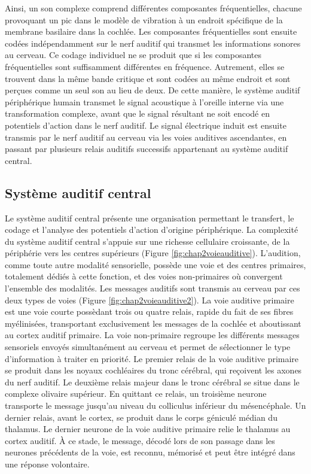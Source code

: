 Ainsi, un son complexe comprend différentes composantes fréquentielles, chacune provoquant un pic dans le modèle de vibration à un endroit spécifique de la membrane basilaire dans la cochlée. 
Les composantes fréquentielles sont ensuite codées indépendamment sur le nerf auditif qui transmet les informations sonores au cerveau. 
Ce codage individuel ne se produit que si les composantes fréquentielles sont suffisamment différentes en fréquence. 
Autrement, elles se trouvent dans la même bande critique et sont codées au même endroit et sont perçues comme un seul son au lieu de deux.
De cette manière, le système auditif périphérique humain transmet le signal acoustique à l'oreille interne via une transformation complexe, avant que le signal résultant ne soit encodé en potentiels d'action dans le nerf auditif. 
Le signal électrique induit est ensuite transmis par le nerf auditif au cerveau via les voies auditives ascendantes, en passant par plusieurs relais auditifs successifs appartenant au système auditif central.

\subsection{Système auditif central}
\label{systemeauditifcentral}

Le système auditif central présente une organisation permettant le transfert, le codage et l’analyse des potentiels d’action d’origine périphérique. 
La complexité du système auditif central s’appuie sur une richesse cellulaire croissante, de la périphérie vers les centres supérieurs (Figure \ref{fig:chap2voieauditive}). 
L'audition, comme toute autre modalité sensorielle, possède une voie et des centres primaires, totalement dédiés à cette fonction, et des voies non-primaires où convergent l'ensemble des modalités. 
Les messages auditifs sont transmis au cerveau par ces deux types de voies (Figure \ref{fig:chap2voieauditive2}). 
La voie auditive primaire est une voie courte possèdant trois ou quatre relais, rapide du fait de ses fibres myélinisées, transportant exclusivement les messages de la cochlée et aboutissant au cortex auditif primaire. 
La voie non-primaire regroupe les différents messages sensoriels envoyés simultanément au cerveau et permet de sélectionner le type d'information à traiter en priorité. 
Le premier relais de la voie auditive primaire se produit dans les noyaux cochléaires du tronc cérébral, qui reçoivent les axones du nerf auditif. 
Le deuxième relais majeur dans le tronc cérébral se situe dans le complexe olivaire supérieur. 
En quittant ce relais, un troisième neurone transporte le message jusqu'au niveau du colliculus inférieur du mésencéphale. 
Un dernier relais, avant le cortex, se produit dans le corps géniculé médian du thalamus. 
Le dernier neurone de la voie auditive primaire relie le thalamus au cortex auditif.
À ce stade, le message, décodé lors de son passage dans les neurones précédents de la voie, est reconnu, mémorisé et peut être intégré dans une réponse volontaire. 


